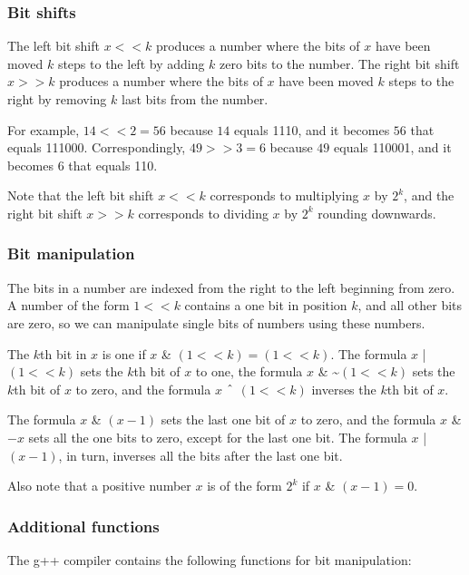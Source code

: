 \subsubsection{Bit shifts}


The left bit shift $x < < k$ produces a number
where the bits of $x$ have been moved $k$ steps to
the left by adding $k$ zero bits to the number.
The right bit shift $x > > k$ produces a number
where the bits of $x$ have been moved $k$ steps
to the right by removing $k$ last bits from the number.

For example, $14 < < 2 = 56$
because $14$ equals 1110,
and it becomes $56$ that equals 111000.
Correspondingly, $49 > > 3 = 6$
because $49$ equals 110001,
and it becomes $6$ that equals 110.

Note that the left bit shift $x < < k$
corresponds to multiplying $x$ by $2^k$,
and the right bit shift $x > > k$
corresponds to dividing $x$ by $2^k$
rounding downwards.

\subsubsection{Bit manipulation}

The bits in a number are indexed from the right
to the left beginning from zero.
A number of the form $1 < < k$ contains a one bit
in position $k$, and all other bits are zero,
so we can manipulate single bits of numbers
using these numbers.

The $k$th bit in $x$ is one if
$x$ \& $(1 < < k) = (1 < < k)$.
The formula $x$ | $(1 < < k)$
sets the $k$th bit of $x$ to one,
the formula
$x$ \& \textasciitilde $(1 < < k)$
sets the $k$th bit of $x$ to zero,
and the formula
$x$ $\XOR$ $(1 < < k)$
inverses the $k$th bit of $x$.

The formula $x$ \& $(x-1)$ sets the last
one bit of $x$ to zero,
and the formula $x$ \& $-x$ sets all the
one bits to zero, except for the last one bit.
The formula $x$ | $(x-1)$, in turn,
inverses all the bits after the last one bit.

Also note that a positive number $x$ is
of the form $2^k$ if $x$ \& $(x-1) = 0$.

\subsubsection*{Additional functions}

The g++ compiler contains the following
functions for bit manipulation:

